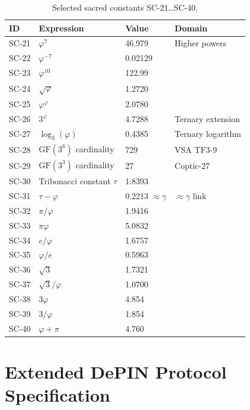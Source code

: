 \begin{table}[h]
\centering
\caption{Selected sacred constants SC-21\ldots SC-40.}
\label{tab:sc-extended}
\begin{tabular}{llll}
\hline
ID & Expression & Value & Domain \\
\hline
SC-21 & \(\varphi^7\) & 46.979 & Higher powers \\
SC-22 & \(\varphi^{-7}\) & 0.02129 & \\
SC-23 & \(\varphi^{10}\) & 122.99 & \\
SC-24 & \(\sqrt{\varphi}\) & 1.2720 & \\
SC-25 & \(\varphi^\varphi\) & 2.0780 & \\
SC-26 & \(3^\varphi\) & 4.7288 & Ternary extension \\
SC-27 & \(\log_3(\varphi)\) & 0.4385 & Ternary logarithm \\
SC-28 & \(\mathrm{GF}(3^6)\) cardinality & 729 & VSA TF3-9 \\
SC-29 & \(\mathrm{GF}(3^3)\) cardinality & 27 & Coptic-27 \\
SC-30 & Tribonacci constant \(\tau\) & 1.8393 & \\
SC-31 & \(\tau - \varphi\) & 0.2213 \(\approx \gamma\) & \(\approx\gamma\) link \\
SC-32 & \(\pi/\varphi\) & 1.9416 & \\
SC-33 & \(\pi\varphi\) & 5.0832 & \\
SC-34 & \(e/\varphi\) & 1.6757 & \\
SC-35 & \(\varphi/e\) & 0.5963 & \\
SC-36 & \(\sqrt{3}\) & 1.7321 & \\
SC-37 & \(\sqrt{3}/\varphi\) & 1.0700 & \\
SC-38 & \(3\varphi\) & 4.854 & \\
SC-39 & \(3/\varphi\) & 1.854 & \\
SC-40 & \(\varphi + \pi\) & 4.760 & \\
\hline
\end{tabular}
\end{table}


\section{Extended DePIN Protocol Specification}
\label{sec:flos74-appendix-b}

